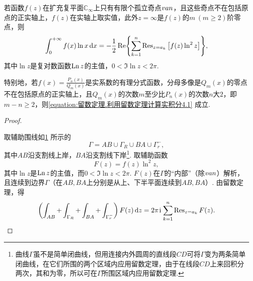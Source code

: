 \begin{theorem}\label{theorem:留数定理.利用留数定理计算实积分4}
若函数\(f(z)\)在扩充复平面\(\mathbb{C}_{\infty}\)上只有有限个孤立奇点\(v{a}{n}\)，且这些奇点不在包括原点的正实轴上，\(f(z)\)在实轴上取实值，此外\(z=\infty\)是\(f(z)\)的\(m\ (m\geqslant2)\)阶零点，则\begin{equation}\label{equation:留数定理.利用留数定理计算实积分4.1}
\int_0^{+\infty} f(x) \ln x \dd{x}
= -\frac{1}{2} \Re{ \sum\limits_{k=1}^n \operatorname{Res}_{z=a_k} \left[ f(z) \ln^2 z \right] },
\end{equation}
其中\(\ln z\)是复对数函数\(\operatorname{Ln} z\)的主值，\(0<\Im \ln z<2\pi\).

特别地，若\(f(x) = \frac{P_n(x)}{Q_m(x)}\)是实系数的有理分式函数，分母多像是\(Q_m(x)\)的零点不在包括原点的正实轴上，且\(Q_m(x)\)的次数\(m\)至少比\(P_n(x)\)的次数\(n\)大\(2\)，即\(m-n\geqslant2\)，则\cref{equation:留数定理.利用留数定理计算实积分4.1} 成立.
\begin{proof}
\begin{figure}[ht]
\centering
{}
\caption{}
\label{figure:留数定理.利用留数定理计算实积分4的辅助积分路径1}
\end{figure}
取辅助围线如\cref{figure:留数定理.利用留数定理计算实积分4的辅助积分路径1} 所示的\[
\Gamma = AB \cup \Gamma_R \cup BA \cup \Gamma_r^-,
\]其中\(AB\)沿支割线上岸，\(BA\)沿支割线下岸\footnote{曲线\(\Gamma\)虽不是简单闭曲线，但用连接内外圆周的直线段\(CD\)可将\(\Gamma\)变为两条简单闭曲线，在它们所围的两个区域内应用留数定理，由于在线段\(CD\)上来回积分两次，其和为零，所以可在\(\Gamma\)所围区域内应用留数定理.}.
取辅助函数\[
F(z) = f(z) \ln^2 z,
\]其中\(\ln z\)是\(\operatorname{Ln} z\)的主值，而\(0<\Im\ln z<2\pi\).
\(F(z)\)在\(\Gamma\)的“内部”（除\(v{a}{n}\)）解析，且连续到边界\(\Gamma\)（在\(AB,BA\)上分别是从上、下半平面连续到\(AB,BA\)）.
由留数定理，得\[
\left(\int_{AB}+\int_{\Gamma_R}+\int_{BA}+\int_{\Gamma_r^-}\right) F(z) \dd{z}
= 2\pi\kern1pt\mathrm{i}\kern1pt \sum\limits_{k=1}^n \operatorname{Res}_{z=a_k} F(z).
\]


\end{proof}
\end{theorem}
